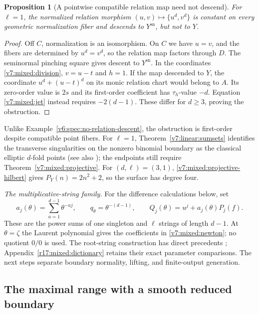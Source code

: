 \documentclass[10pt,fleqn]{article}
\numberwithin{equation}{section}
\newtheorem{proposition}[theorem]{Proposition}
\begin{document}
\begin{proposition}[A pointwise compatible relation map need not descend]
\label{v7:mixed:relation-obstruction}
For $\ell=1$, the normalized relation morphism
$(u,v)\mapsto\{u^d,v^d\}$ is constant on every geometric normalization
fiber and descends to $Y^{\mathrm{sn}}$, but not to $Y$.
\end{proposition}
\begin{proof}
Off $C$, normalization is an isomorphism.  On $C$ we have $u=v$, and the
fibers are determined by $u^d=v^d$, so the relation map factors through
$D$.  The seminormal pinching square gives descent to $Y^{\mathrm{sn}}$.
In the coordinates \eqref{v7:mixed:division}, $v=u-t$ and $h=1$.
If the map descended to $Y$, the coordinate $u^d+(u-t)^d$ on its monic
relation chart would belong to $A$.  Its zero-order value is $2s$ and
its first-order coefficient has $\tau_h$-value $-d$.
Equation \eqref{v7:mixed:jet} instead requires $-2(d-1)$.
These differ for $d\ge3$, proving the obstruction.
\end{proof}

Unlike Example~\ref{v6:spec:no-relation-descent}, the obstruction is
first-order despite compatible point fibers.
For $\ell=1$, Theorem~\ref{v7:linear:sumsets} identifies the transverse
singularities on the nonzero binomial boundary as the classical elliptic
$d$-fold points \cite[Definition~2.1]{Smyth}
(see also \cite[Section~1]{Stevens}); the endpoints still require
Theorem~\ref{v7:mixed:projective}.  For $(d,\ell)=(3,1)$, \eqref{v7:mixed:projective-hilbert}
gives $P_Y(n)=2n^2+2$, so the surface has degree four.

\textit{The multiplicative-string family.}
For the difference calculations below, set
\[
 a_j(\theta)=\sum_{a=1}^{d-1}\theta^{-aj},\qquad
 q_\theta=\theta^{-(d-1)},\qquad
 Q_j(\theta)=u^j+a_j(\theta)P_j(f).
\]
These are the power sums of one singleton and $\ell$ strings of length
$d-1$.  At $\theta=\zeta$ the Laurent polynomial gives the coefficients
in \eqref{v7:mixed:newton}; no quotient $0/0$ is used.
The root-string construction has direct precedents
\cite{EtingofRains,SergeevVeselovMR,KasataniMultiwheel};
Appendix~\ref{r17:mixed:dictionary} retains their exact parameter
comparisons.  The next steps separate boundary normality, lifting,
and finite-output generation.

\subsection{The maximal range with a smooth reduced boundary}
\label{r23:mixed:boundary-range}
\end{document}
